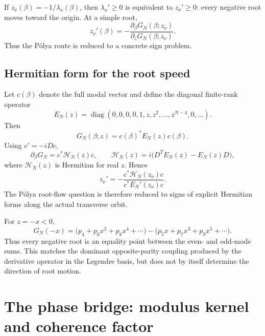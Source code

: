 \documentclass[11pt]{amsart}
\numberwithin{equation}{section}
\theoremstyle{plain}
\theoremstyle{definition}
\theoremstyle{remark}
\begin{document}
If $z_\nu(\beta)=-1/\lambda_\nu(\beta)$, then $\lambda_\nu'\ge0$ is equivalent to $z_\nu'\ge0$: every negative root moves toward the origin.  At a simple root,
\begin{equation}
\boxed{
z_\nu'(\beta)
=-\frac{\partial_\beta G_N(\beta;z_\nu)}{\partial_zG_N(\beta;z_\nu)}.
}
\label{eq:root-speed}
\end{equation}
Thus the Pólya route is reduced to a concrete sign problem.

\subsection{Hermitian form for the root speed}

Let $c(\beta)$ denote the full modal vector and define the diagonal finite-rank operator
\begin{equation}
E_N(z)=\operatorname{diag}(0,0,0,0,1,z,z^2,\ldots,z^{N-4},0,\ldots).
\end{equation}
Then
\begin{equation}
G_N(\beta;z)=c(\beta)^*E_N(z)c(\beta).
\end{equation}
Using $c'=-iDc$,
\begin{equation}
\boxed{
\partial_\beta G_N
=c^*\mathscr H_N(z)c,
\qquad
\mathscr H_N(z)=i\bigl(D^TE_N(z)-E_N(z)D\bigr),
}
\label{eq:Hroot}
\end{equation}
where $\mathscr H_N(z)$ is Hermitian for real $z$.  Hence
\begin{equation}
\boxed{
z_\nu'
=-\frac{c^*\mathscr H_N(z_\nu)c}{c^*E_N'(z_\nu)c}.
}
\label{eq:root-Hermitian}
\end{equation}
The Pólya root-flow question is therefore reduced to signs of explicit Hermitian forms along the actual transverse orbit.

For $z=-x<0$,
\begin{equation}
G_N(-x)
=\bigl(p_4+p_6x^2+p_8x^4+\cdots\bigr)
-\bigl(p_5x+p_7x^3+p_9x^5+\cdots\bigr).
\end{equation}
Thus every negative root is an equality point between the even- and odd-mode sums.  This matches the dominant opposite-parity coupling produced by the derivative operator in the Legendre basis, but does not by itself determine the direction of root motion.

\section{The phase bridge: modulus kernel and coherence factor}
\label{sec:phase-bridge}
\end{document}
